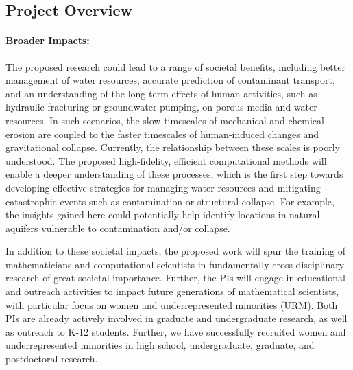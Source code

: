 \documentclass[11pt]{article}
\begin{document}
\subsection{Project Overview}

\paragraph{Broader Impacts:} The proposed research could lead to a range of societal benefits, including better management of water resources, accurate prediction of contaminant transport, and an understanding of the long-term effects of human activities, such as hydraulic fracturing or groundwater pumping, on porous media and water resources. In such scenarios, the slow timescales of mechanical and chemical erosion are coupled to the faster timescales of human-induced changes and gravitational collapse. Currently, the relationship between these scales is poorly understood. The proposed high-fidelity, efficient computational methods will enable a deeper understanding of these processes, which is the first step towards developing effective strategies for managing water resources and mitigating catastrophic events such as contamination or structural collapse. For example, the insights gained here could potentially help identify locations in natural aquifers vulnerable to contamination and/or collapse.  

In addition to these societal impacts, the proposed work will spur the training of mathematicians and computational scientists in fundamentally cross-disciplinary research of great societal importance. Further, the PIs will engage in educational and outreach activities to impact future generations of mathematical scientists, with particular focus on women and underrepresented minorities (URM). Both PIs are already actively involved in graduate and undergraduate research, as well as outreach to K-12 students. Further, we have successfully recruited women and underrepresented minorities in high school, undergraduate, graduate, and postdoctoral research.  
\end{document}
